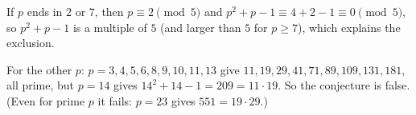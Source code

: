 If $p$ ends in $2$ or $7$, then $p\equiv2\pmod5$ and $p^2+p-1\equiv4+2-1\equiv0\pmod5$, so $p^2+p-1$ is a multiple of $5$ (and larger than $5$ for $p\ge7$), which explains the exclusion.

For the other $p$: $p=3,4,5,6,8,9,10,11,13$ give $11,19,29,41,71,89,109,131,181$, all prime, but $p=\boxed{14}$ gives $14^2+14-1=209=11\cdot19$. So the conjecture is false. (Even for prime $p$ it fails: $p=23$ gives $551=19\cdot29$.)
